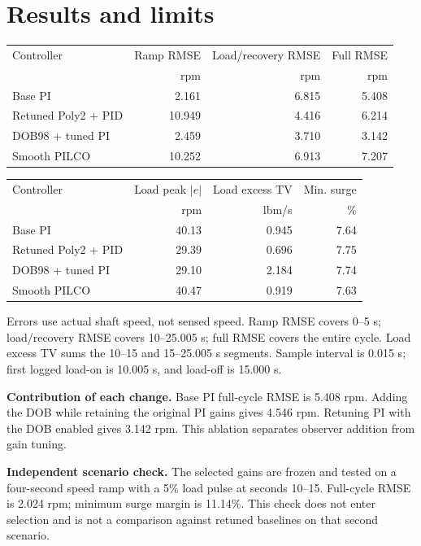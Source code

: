 \section{Results and limits}
\begin{center}\small\begin{tabular}{lrrr}\toprule Controller & Ramp RMSE & Load/recovery RMSE & Full RMSE\\ & rpm & rpm & rpm\\\midrule
Base PI & 2.161 & 6.815 & 5.408 \\
Retuned Poly2 + PID & 10.949 & 4.416 & 6.214 \\
DOB98 + tuned PI & 2.459 & 3.710 & 3.142 \\
Smooth PILCO & 10.252 & 6.913 & 7.207 \\
\bottomrule\end{tabular}\end{center}
\begin{center}\small\begin{tabular}{lrrr}\toprule Controller & Load peak $|e|$ & Load excess TV & Min. surge\\ & rpm & lbm/s & \%\\\midrule
Base PI & 40.13 & 0.945 & 7.64 \\
Retuned Poly2 + PID & 29.39 & 0.696 & 7.75 \\
DOB98 + tuned PI & 29.10 & 2.184 & 7.74 \\
Smooth PILCO & 40.47 & 0.919 & 7.63 \\
\bottomrule\end{tabular}\end{center}
Errors use actual shaft speed, not sensed speed. Ramp RMSE covers 0--5 s; load/recovery RMSE covers 10--25.005 s; full RMSE covers the entire cycle. Load excess TV sums the 10--15 and 15--25.005 s segments. Sample interval is 0.015 s; first logged load-on is 10.005 s, and load-off is 15.000 s.

\textbf{Contribution of each change.} Base PI full-cycle RMSE is 5.408 rpm. Adding the DOB while retaining the original PI gains gives 4.546 rpm. Retuning PI with the DOB enabled gives 3.142 rpm. This ablation separates observer addition from gain tuning.

\textbf{Independent scenario check.} The selected gains are frozen and tested on a four-second speed ramp with a 5\% load pulse at seconds 10--15. Full-cycle RMSE is 2.024 rpm; minimum surge margin is 11.14\%. This check does not enter selection and is not a comparison against retuned baselines on that second scenario.

